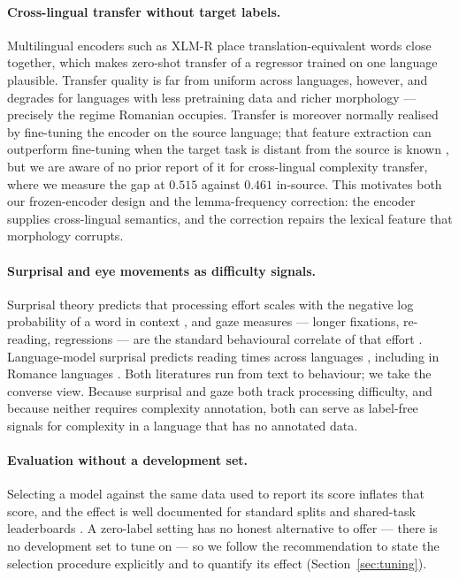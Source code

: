 \documentclass[11pt]{article}
\begin{document}
\paragraph{Cross-lingual transfer without target labels.}
Multilingual encoders such as XLM-R \citep{conneau2020xlmr} place
translation-equivalent words close together, which makes zero-shot
transfer of a regressor trained on one language plausible. Transfer
quality is far from uniform across languages, however, and degrades for
languages with less pretraining data and richer morphology
\citep{pires-etal-2019-multilingual, wu-dredze-2020-languages} ---
precisely the regime Romanian occupies. Transfer is moreover normally
realised by fine-tuning the encoder on the source language; that feature
extraction can outperform fine-tuning when the target task is distant
from the source is known \citep{peters-etal-2019-tune}, but we are aware
of no prior report of it for cross-lingual complexity transfer, where we
measure the gap at $0.515$ against $0.461$ in-source. This motivates both
our frozen-encoder design and the lemma-frequency correction: the encoder
supplies cross-lingual semantics, and the correction repairs the lexical
feature that morphology corrupts.

\paragraph{Surprisal and eye movements as difficulty signals.}
Surprisal theory predicts that processing effort scales with the
negative log probability of a word in context \citep{hale2001probabilistic},
and gaze measures --- longer fixations, re-reading, regressions ---
are the standard behavioural correlate of that effort
\citep{rayner1998eye}. Language-model surprisal predicts reading times
across languages \citep{hollenstein-etal-2021-multilingual}, including
in Romance languages \citep{alves-2025-benchmarking}. Both literatures
run from text to behaviour; we take the converse view. Because surprisal
and gaze both track processing difficulty, and because neither requires
complexity annotation, both can serve as label-free signals for
complexity in a language that has no annotated data.

\paragraph{Evaluation without a development set.}
Selecting a model against the same data used to report its score
inflates that score, and the effect is well documented for standard
splits and shared-task leaderboards \citep{gorman-bedrick-2019-need}.
A zero-label setting has no honest alternative to offer --- there is no
development set to tune on --- so we follow the recommendation to state
the selection procedure explicitly and to quantify its effect
(Section~\ref{sec:tuning}).
\end{document}
